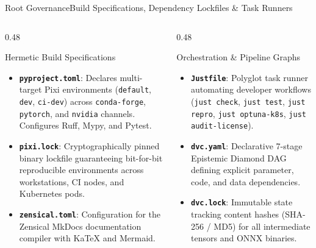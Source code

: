\begin{frame}{Root Governance}{Build Specifications, Dependency Lockfiles \& Task Runners}
    \begin{columns}[T]
        \begin{column}{0.48\textwidth}
            \begin{block}{Hermetic Build Specifications}
                \begin{itemize}\footnotesize
                    \item \textbf{\texttt{pyproject.toml}}: Declares multi-target Pixi environments (\texttt{default}, \texttt{dev}, \texttt{ci-dev}) across \texttt{conda-forge}, \texttt{pytorch}, and \texttt{nvidia} channels. Configures Ruff, Mypy, and Pytest.
                    \item \textbf{\texttt{pixi.lock}}: Cryptographically pinned binary lockfile guaranteeing bit-for-bit reproducible environments across workstations, CI nodes, and Kubernetes pods.
                    \item \textbf{\texttt{zensical.toml}}: Configuration for the Zensical MkDocs documentation compiler with KaTeX and Mermaid.
                \end{itemize}
            \end{block}
        \end{column}
        \begin{column}{0.48\textwidth}
            \begin{block}{Orchestration \& Pipeline Graphs}
                \begin{itemize}\footnotesize
                    \item \textbf{\texttt{Justfile}}: Polyglot task runner automating developer workflows (\texttt{just check}, \texttt{just test}, \texttt{just repro}, \texttt{just optuna-k8s}, \texttt{just audit-license}).
                    \item \textbf{\texttt{dvc.yaml}}: Declarative 7-stage Epistemic Diamond DAG defining explicit parameter, code, and data dependencies.
                    \item \textbf{\texttt{dvc.lock}}: Immutable state tracking content hashes (SHA-256 / MD5) for all intermediate tensors and ONNX binaries.
                \end{itemize}
            \end{block}
        \end{column}
    \end{columns}


\end{frame}
